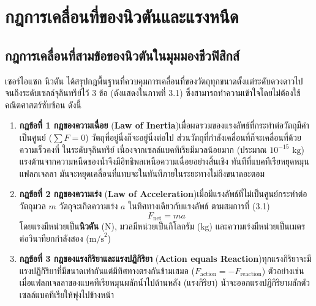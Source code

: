 \chapter{กฎการเคลื่อนที่ของนิวตันและแรงหนืด}

\section{กฎการเคลื่อนที่สามข้อของนิวตันในมุมมองชีวฟิสิกส์}


เซอร์ไอแซก นิวตัน ได้สรุปกฎพื้นฐานที่ควบคุมการเคลื่อนที่ของวัตถุทุกขนาดตั้งแต่ระดับดวงดาวไปจนถึงระดับเซลล์จุลินทรีย์ไว้ 3 ข้อ (ดังแสดงใน\mbox{ภาพที่} 3.1) ซึ่งสามารถทำความเข้าใจโดยไม่ต้องใช้คณิตศาสตร์ซับซ้อน ดังนี้

\begin{enumerate}
    \item \textbf{กฎข้อที่ 1 กฎของความเฉื่อย} (\textbf{Law of Inertia})\quad เมื่อผลรวมของแรงลัพธ์ที่กระทำต่อวัตถุมีค่าเป็นศูนย์ ($\sum F = 0$) วัตถุที่อยู่นิ่งก็จะอยู่นิ่งต่อไป ส่วนวัตถุที่กำลังเคลื่อนที่ก็จะเคลื่อนที่ด้วยความเร็วคงที่ ในระดับจุลินทรีย์ เนื่องจากเซลล์แบคทีเรียมีมวลน้อยมาก (ประมาณ $10^{-15}\text{ kg}$) แรงต้านจากความหนืดของน้ำจึงมีอิทธิพลเหนือความเฉื่อยอย่างสิ้นเชิง ทันทีที่แบคทีเรียหยุดหมุนแฟลกเจลลา มันจะหยุดเคลื่อนที่แทบจะในทันทีภายในระยะทางไม่ถึงขนาดอะตอม
    \item \textbf{กฎข้อที่ 2 กฎของความเร่ง} (\textbf{Law of Acceleration})\quad เมื่อมีแรงลัพธ์ที่ไม่เป็นศูนย์กระทำต่อวัตถุมวล $m$ วัตถุจะเกิดความเร่ง $a$ ในทิศทางเดียวกับแรงลัพธ์ ตามสมการที่ (3.1)
    \begin{equation}
        F_{\text{net}} = m a
    \end{equation}
    โดยแรงมีหน่วยเป็น\textbf{นิวตัน} ($\text{N}$), มวลมีหน่วยเป็นกิโลกรัม ($\text{kg}$) และความเร่งมีหน่วยเป็นเมตรต่อวินาทียกกำลังสอง ($\text{m/s}^2$)
    \item \textbf{กฎข้อที่ 3 กฎของแรงกิริยาและแรงปฏิกิริยา} (\textbf{Action equals Reaction})\quad ทุกแรงกิริยาจะมีแรงปฏิกิริยาที่มีขนาดเท่ากันแต่มีทิศทางตรงกันข้ามเสมอ ($F_{\text{action}} = -F_{\text{reaction}}$) ตัวอย่างเช่น เมื่อแฟลกเจลลาของแบคทีเรียหมุนผลักน้ำไปด้านหลัง (แรงกิริยา) น้ำจะออกแรงปฏิกิริยาผลักตัวเซลล์แบคทีเรียให้พุ่งไปข้างหน้า
\end{enumerate}

